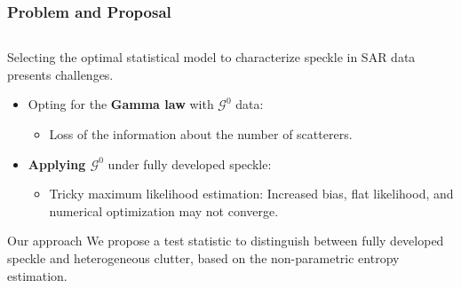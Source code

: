 \documentclass[aspectratio=169,10pt]{beamer}
\begin{document}
\begin{frame} \frametitle{\large{Problem and Proposal}}\vspace{0.4cm}	

 \justifying
\begin{columns}[T,onlytextwidth]
    \begin{column}{.8\textwidth}
			\begin{exampleblock}{}\justifying
Selecting the optimal statistical model to characterize speckle in SAR data presents challenges. 
\pause
\begin{itemize}
    \item Opting for the \textbf{Gamma law }with $\mathcal{G}^0$ data:
    \begin{itemize}
        \item Loss of the information about the number of scatterers.
    \end{itemize}
		\pause
    \item \textbf{Applying $\mathcal{G}^0$} under fully developed speckle:
    \begin{itemize}
        \item Tricky maximum likelihood estimation:
       Increased bias, flat likelihood, and numerical optimization may not
converge.
        
    \end{itemize}
\end{itemize}
		 
	\end{exampleblock}
	\pause
	\begin{exampleblock}{Our approach}\vspace{0.2cm}	
	\justifying
		\textcolor[rgb]{0,0,0.55}{ We propose a test statistic to distinguish between fully developed speckle and heterogeneous clutter, based on the non-parametric entropy estimation}.


	\end{exampleblock}
		
    \end{column}
    
\end{columns}\vspace{0.2cm}


\end{frame} 
\end{document}
